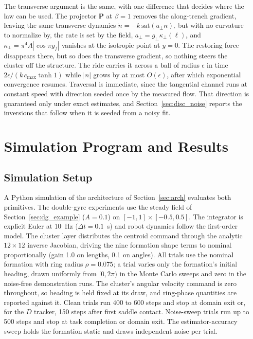 \documentclass[lettersize,journal]{IEEEtran}
\begin{document}
The transverse argument is the same, with one difference that decides
where the law can be used. The projector $\mathbf{P}$ at $\beta = 1$
removes the along-trench gradient, leaving the same transverse dynamics
$\dot{n} = -k\,\mathrm{sat}(a_\perp n)$, but with no curvature to
normalize by, the rate is set by the field, $a_\perp = g_\perp
\kappa_\perp(\ell)$, and $\kappa_\perp = \pi^4 A|\cos \pi y_f|$ vanishes
at the isotropic point at $y = 0$. The restoring force disappears there, but so does the transverse gradient, so nothing steers the cluster off the structure. The ride carries it across a ball of radius $\epsilon$ in time $2\epsilon/(k\,c_{\max}\tanh 1)$ while $|n|$ grows by at most $O(\epsilon)$, after which exponential convergence resumes. Traversal is immediate, since the tangential channel runs at constant speed with direction seeded once by the measured flow. That direction is guaranteed only under exact estimates, and Section~\ref{sec:disc_noise} reports the inversions that follow when it is seeded from a noisy fit.

\section{Simulation Program and Results}

\subsection{Simulation Setup}

A Python simulation of the architecture of Section~\ref{sec:arch} evaluates both primitives.
The double-gyre experiments use the steady field of
Section~\ref{sec:dg_example} ($A = 0.1$) on $[-1, 1] \times
[-0.5, 0.5]$. The integrator is explicit Euler at 10~Hz ($\Delta t = 0.1$~s) and robot dynamics follow the first-order model. The cluster layer distributes the centroid command through the analytic $12 \times 12$ inverse Jacobian, driving the nine formation shape terms to nominal proportionally (gain 1.0 on lengths, 0.1 on angles). All trials use the nominal
formation with ring radius $\rho = 0.075$; a trial varies only the
formation's initial heading, drawn uniformly from $[0, 2\pi)$ in the
Monte Carlo sweeps and zero in the noise-free demonstration runs. The
cluster's angular velocity command is zero throughout, so
heading is held fixed at its draw, and ring-phase quantities are reported against it. Clean trials
run 400 to 600 steps and stop at domain exit or, for the $D$ tracker,
150 steps after first saddle contact. Noise-sweep trials run up to 500
steps and stop at task completion or domain exit. The
estimator-accuracy sweep holds the formation static and draws
independent noise per trial.
\end{document}
